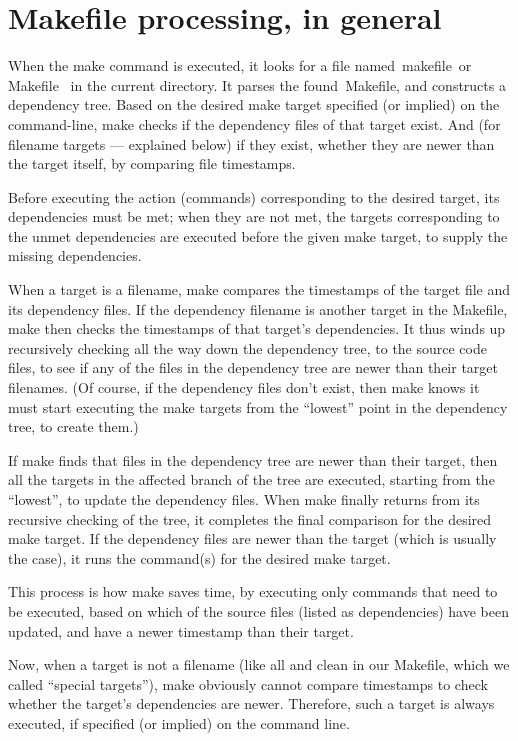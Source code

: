 \documentclass[output=paper, 
colorlinks,
citecolor=brown,
newtxmath
]{langscibook}
\begin{document}
\section {Makefile processing, in general}

When the make command is executed, it looks for a file 
named makefile or \\
Makefile  in the current directory. 
It parses the found Makefile, and constructs a dependency tree. 
Based on the desired make target specified (or implied) on the command-line, 
make checks if the dependency files of that target exist. And (for 
filename targets — explained below) if they exist, whether they 
are newer than the target itself, by comparing file timestamps.

Before executing the action (commands) corresponding to the desired target, its dependencies must be met; when they are not met, the targets corresponding to the unmet dependencies are executed before the given make target, to supply the missing dependencies.

When a target is a filename, make compares the timestamps of the target file and its dependency files. If the dependency filename is another target in the Makefile, make then checks the timestamps of that target’s dependencies. It thus winds up recursively checking all the way down the dependency tree, to the source code files, to see if any of the files in the dependency tree are newer than their target filenames. (Of course, if the dependency files don’t exist, then make knows it must start executing the make targets from the “lowest” point in the dependency tree, to create them.)

If make finds that files in the dependency tree are newer than their target, then all the targets in the affected branch of the tree are executed, starting from the “lowest”, to update the dependency files. When make finally returns from its recursive checking of the tree, it completes the final comparison for the desired make target. If the dependency files are newer than the target (which is usually the case), it runs the command(s) for the desired make target.

This process is how make saves time, by executing only commands that need to be executed, based on which of the source files (listed as dependencies) have been updated, and have a newer timestamp than their target.

Now, when a target is not a filename (like all and clean in our Makefile, which we called “special targets”), make obviously cannot compare timestamps to check whether the target’s dependencies are newer. Therefore, such a target is always executed, if specified (or implied) on the command line.
\end{document}
